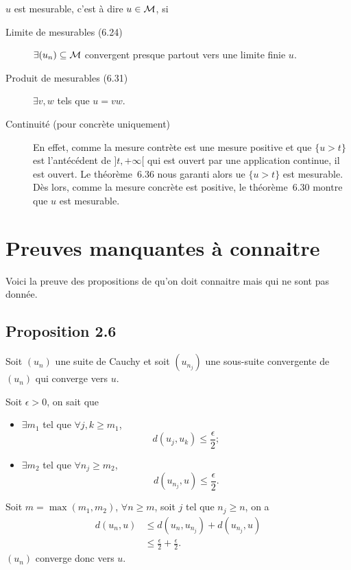 \begin{myprop}
  $u$ est mesurable, c'est à dire $u \in \mathcal{M}$, si
  \begin{description}
    \item[Limite de mesurables (6.24)] $\exists (u_n) \subseteq \mathcal{M}$ convergent presque partout vers
      une limite finie $u$.
    \item[Produit de mesurables (6.31)] $\exists v,w$ tels que $u = vw$.
    \item[Continuité (pour concrète uniquement)] En effet, comme la mesure contrète est une mesure positive
      et que $\{u > t\}$ est l'antécédent de $]t,+\infty[$ qui est ouvert par une application continue, il est ouvert.
      Le théorème~6.36 nous garanti alors ue $\{u > t\}$ est mesurable.
      Dès lors, comme la mesure concrète est positive, le théorème~6.30 montre que $u$ est mesurable.
  \end{description}
\end{myprop}

\annexe
\section{Preuves manquantes à connaitre}
Voici la preuve des propositions de \cite{willem2008principes}
qu'on doit connaitre mais qui ne sont pas donnée.
\subsection{Proposition 2.6}
Soit $(u_n)$ une suite de Cauchy et soit
$(u_{n_j})$ une sous-suite convergente de $(u_n)$ qui converge
vers $u$.

Soit $\epsilon > 0$, on sait que
\begin{itemize}
  \item $\exists m_1$ tel que $\forall j, k \geq m_1$,
    \[ d(u_j, u_k) \leq \frac{\epsilon}{2}; \]
  \item $\exists m_2$ tel que $\forall n_j \geq m_2$,
    \[ d(u_{n_j}, u) \leq \frac{\epsilon}{2}. \]
\end{itemize}
Soit $m = \max(m_1, m_2)$, $\forall n \geq m$,
soit $j$ tel que $n_j \geq n$, on a
\begin{align*}
  d(u_n, u) & \leq d(u_n, u_{n_j}) + d(u_{n_j}, u)\\
            & \leq \frac{\epsilon}{2} + \frac{\epsilon}{2}.
\end{align*}
$(u_n)$ converge donc vers $u$.

